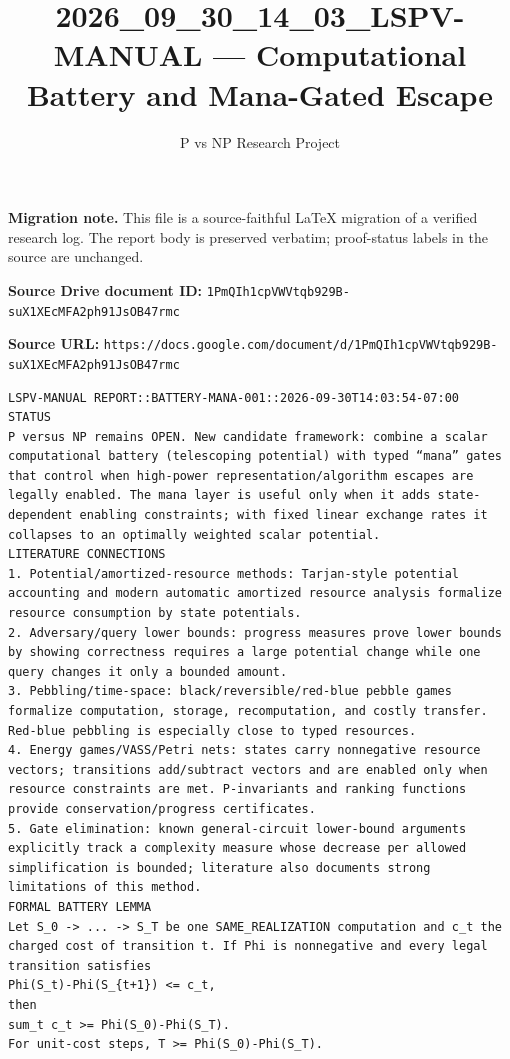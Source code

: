 \documentclass[11pt]{article}
\title{2026\_09\_30\_14\_03\_LSPV-MANUAL — Computational Battery and Mana-Gated Escape}
\author{P vs NP Research Project}
\date{}
\begin{document}
\maketitle

\noindent\textbf{Migration note.} This file is a source-faithful LaTeX migration of a verified research log. The report body is preserved verbatim; proof-status labels in the source are unchanged.

\noindent\textbf{Source Drive document ID:} \texttt{1PmQIh1cpVWVtqb929B-suX1XEcMFA2ph91JsOB47rmc}

\noindent\textbf{Source URL:} \texttt{https://docs.google.com/document/d/1PmQIh1cpVWVtqb929B-suX1XEcMFA2ph91JsOB47rmc}

\bigskip
\begin{Verbatim}[breaklines=true,breakanywhere=true]
LSPV-MANUAL REPORT::BATTERY-MANA-001::2026-09-30T14:03:54-07:00
STATUS
P versus NP remains OPEN. New candidate framework: combine a scalar computational battery (telescoping potential) with typed “mana” gates that control when high-power representation/algorithm escapes are legally enabled. The mana layer is useful only when it adds state-dependent enabling constraints; with fixed linear exchange rates it collapses to an optimally weighted scalar potential.
LITERATURE CONNECTIONS
1. Potential/amortized-resource methods: Tarjan-style potential accounting and modern automatic amortized resource analysis formalize resource consumption by state potentials.
2. Adversary/query lower bounds: progress measures prove lower bounds by showing correctness requires a large potential change while one query changes it only a bounded amount.
3. Pebbling/time-space: black/reversible/red-blue pebble games formalize computation, storage, recomputation, and costly transfer. Red-blue pebbling is especially close to typed resources.
4. Energy games/VASS/Petri nets: states carry nonnegative resource vectors; transitions add/subtract vectors and are enabled only when resource constraints are met. P-invariants and ranking functions provide conservation/progress certificates.
5. Gate elimination: known general-circuit lower-bound arguments explicitly track a complexity measure whose decrease per allowed simplification is bounded; literature also documents strong limitations of this method.
FORMAL BATTERY LEMMA
Let S_0 -> ... -> S_T be one SAME_REALIZATION computation and c_t the charged cost of transition t. If Phi is nonnegative and every legal transition satisfies
Phi(S_t)-Phi(S_{t+1}) <= c_t,
then
sum_t c_t >= Phi(S_0)-Phi(S_T).
For unit-cost steps, T >= Phi(S_0)-Phi(S_T).

\end{Verbatim}
\end{document}
